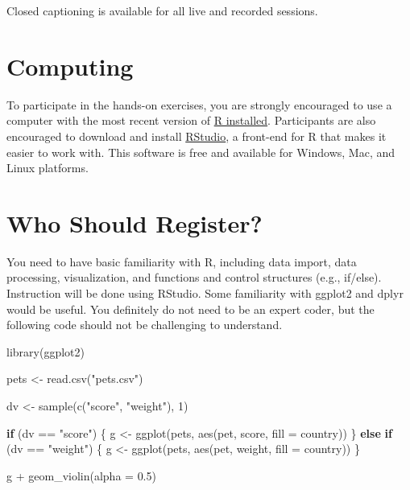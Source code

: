 \documentclass[
]{book}
\newenvironment{Shaded}{\begin{snugshade}}{\end{snugshade}}
\newcommand{\AttributeTok}[1]{\textcolor[rgb]{0.77,0.63,0.00}{#1}}
\newcommand{\ControlFlowTok}[1]{\textcolor[rgb]{0.13,0.29,0.53}{\textbf{#1}}}
\newcommand{\DecValTok}[1]{\textcolor[rgb]{0.00,0.00,0.81}{#1}}
\newcommand{\FloatTok}[1]{\textcolor[rgb]{0.00,0.00,0.81}{#1}}
\newcommand{\FunctionTok}[1]{\textcolor[rgb]{0.00,0.00,0.00}{#1}}
\newcommand{\NormalTok}[1]{#1}
\newcommand{\OtherTok}[1]{\textcolor[rgb]{0.56,0.35,0.01}{#1}}
\newcommand{\SpecialCharTok}[1]{\textcolor[rgb]{0.00,0.00,0.00}{#1}}
\newcommand{\StringTok}[1]{\textcolor[rgb]{0.31,0.60,0.02}{#1}}
\begin{document}
Closed captioning is available for all live and recorded sessions.

\hypertarget{computing}{%
\section{Computing}\label{computing}}

To participate in the hands-on exercises, you are strongly encouraged to use a computer with the most recent version of \href{https://www.r-project.org/}{R installed}. Participants are also encouraged to download and install \href{https://www.rstudio.com/products/rstudio/download/}{RStudio}, a front-end for R that makes it easier to work with. This software is free and available for Windows, Mac, and Linux platforms.

\hypertarget{who-should-register}{%
\section{Who Should Register?}\label{who-should-register}}

You need to have basic familiarity with R, including data import, data processing, visualization, and functions and control structures (e.g., if/else). Instruction will be done using RStudio. Some familiarity with ggplot2 and dplyr would be useful. You definitely do not need to be an expert coder, but the following code should not be challenging to understand.

\begin{Shaded}
\begin{Highlighting}[]
\FunctionTok{library}\NormalTok{(ggplot2)}

\NormalTok{pets }\OtherTok{\textless{}{-}} \FunctionTok{read.csv}\NormalTok{(}\StringTok{"pets.csv"}\NormalTok{)}

\NormalTok{dv }\OtherTok{\textless{}{-}} \FunctionTok{sample}\NormalTok{(}\FunctionTok{c}\NormalTok{(}\StringTok{"score"}\NormalTok{, }\StringTok{"weight"}\NormalTok{), }\DecValTok{1}\NormalTok{)}

\ControlFlowTok{if}\NormalTok{ (dv }\SpecialCharTok{==} \StringTok{"score"}\NormalTok{) \{}
\NormalTok{  g }\OtherTok{\textless{}{-}} \FunctionTok{ggplot}\NormalTok{(pets, }\FunctionTok{aes}\NormalTok{(pet, score, }\AttributeTok{fill =}\NormalTok{ country))}
\NormalTok{\} }\ControlFlowTok{else} \ControlFlowTok{if}\NormalTok{ (dv }\SpecialCharTok{==} \StringTok{"weight"}\NormalTok{) \{}
\NormalTok{  g }\OtherTok{\textless{}{-}} \FunctionTok{ggplot}\NormalTok{(pets, }\FunctionTok{aes}\NormalTok{(pet, weight, }\AttributeTok{fill =}\NormalTok{ country))}
\NormalTok{\}}

\NormalTok{g }\SpecialCharTok{+} \FunctionTok{geom\_violin}\NormalTok{(}\AttributeTok{alpha =} \FloatTok{0.5}\NormalTok{)}
\end{Highlighting}
\end{Shaded}
\end{document}
